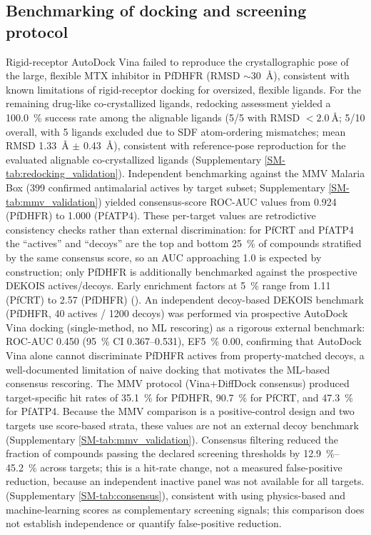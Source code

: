 \documentclass[journal=jcisd8,manuscript=article]{achemso}
\begin{document}
\subsection{Benchmarking of docking and screening protocol}

Rigid-receptor AutoDock Vina failed to reproduce the crystallographic pose of the large, flexible MTX inhibitor in PfDHFR (RMSD $\sim$\qty{30}{\angstrom}),
consistent with known limitations of rigid-receptor docking for oversized, flexible ligands. For the remaining drug-like co-crystallized ligands, redocking
assessment yielded a \qty{100.0}{\percent} success rate among the alignable ligands (5/5 with RMSD $< \qty{2.0}{\angstrom}$; 5/10 overall, with 5 ligands excluded
due to SDF atom-ordering mismatches; mean RMSD \qty{1.33}{\angstrom} $\pm$ \qty{0.43}{\angstrom}), consistent with reference-pose reproduction for the evaluated
alignable co-crystallized ligands (Supplementary \cref{SM-tab:redocking_validation}). Independent benchmarking against the MMV Malaria Box
(\num{399} confirmed antimalarial actives by target subset; Supplementary \cref{SM-tab:mmv_validation}) yielded consensus-score ROC-AUC values from \num{0.924}
(PfDHFR) to \num{1.000} (PfATP4). These per-target values are retrodictive consistency checks rather than external discrimination: for PfCRT and PfATP4 the ``actives'' and ``decoys'' are the top and bottom \qty{25}{\percent} of compounds stratified by the same consensus score, so an AUC approaching \num{1.0} is expected by construction; only PfDHFR is additionally benchmarked against the prospective DEKOIS actives/decoys. Early enrichment factors at
\qty{5}{\percent} range from \num{1.11} (PfCRT) to \num{2.57} (PfDHFR) (). An
independent decoy-based DEKOIS benchmark (PfDHFR, \num{40} actives / \num{1200} decoys) was performed via prospective AutoDock Vina docking
(single-method, no ML rescoring) as a rigorous external benchmark: ROC-AUC \num{0.450} (\qty{95}{\percent} CI \numrange{0.367}{0.531}), EF\qty{5}{\percent}
\num{0.00}, confirming that AutoDock Vina alone cannot discriminate PfDHFR actives from property-matched decoys, a well-documented limitation of naive docking
\cite{Bauer2013} that motivates the ML-based consensus rescoring. The MMV protocol (Vina+DiffDock consensus) produced target-specific hit rates of \qty{35.1}{\percent} for PfDHFR, \qty{90.7}{\percent} for PfCRT, and \qty{47.3}{\percent} for PfATP4. Because the MMV comparison is a positive-control design and two targets use score-based strata, these values are not an external decoy benchmark (Supplementary
\cref{SM-tab:mmv_validation}). Consensus filtering reduced the fraction of compounds passing the declared screening thresholds by \qtyrange{12.9}{45.2}{\percent} across targets; this is a hit-rate change, not a measured false-positive reduction, because an independent inactive panel was not available for all targets.
(Supplementary \cref{SM-tab:consensus}), consistent with using physics-based and machine-learning scores as complementary screening signals; this comparison does not establish independence or quantify false-positive reduction.
\end{document}
